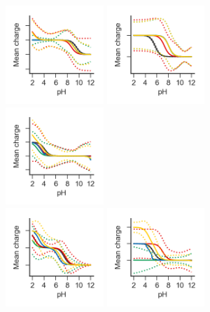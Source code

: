 \documentclass[9pt,lineno,final]{elife}
\begin{document}
 \begin{figure}[H]	
	\centering
	\includegraphics[width=0.33\textwidth]{Reports/overview-virtual-titration-SM19.png}
	\includegraphics[width=0.33\textwidth]{Reports/overview-virtual-titration-SM20.png}
	\includegraphics[width=0.33\textwidth]{Reports/overview-virtual-titration-SM21.png}	 \\
	\includegraphics[width=0.33\textwidth]{Reports/overview-virtual-titration-SM22.png}
	\includegraphics[width=0.33\textwidth]{Reports/overview-virtual-titration-SM23.png}

\end{figure}
\end{document}
